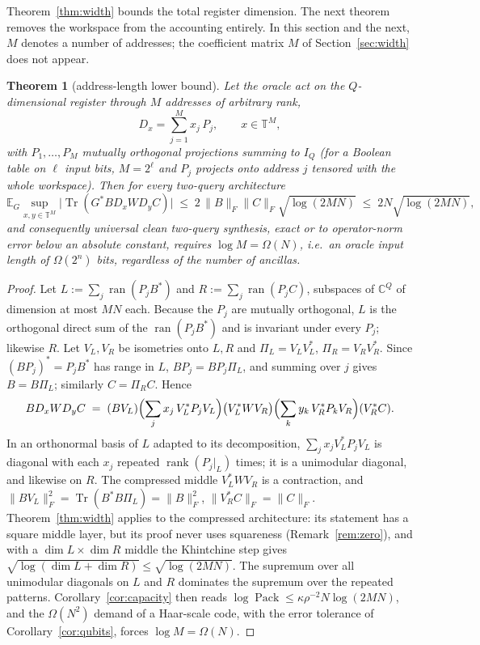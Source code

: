\documentclass[11pt,a4paper]{article}
\theoremstyle{plain}
\newtheorem{theorem}{Theorem}[section]
\theoremstyle{definition}
\theoremstyle{remark}
\DeclareMathOperator{\Tr}{Tr}
\DeclareMathOperator{\ran}{ran}
\DeclareMathOperator{\Pack}{Pack}
\DeclareMathOperator{\rank}{rank}
\newcommand{\T}{\mathbb T}
\newcommand{\C}{\mathbb C}
\newcommand{\E}{\mathbb E}
\newcommand{\Fro}[1]{\|#1\|_F}
\begin{document}
Theorem~\ref{thm:width} bounds the total register dimension. The next theorem removes the
workspace from the accounting entirely. In this section and the next, $M$ denotes a number
of addresses; the coefficient matrix $M$ of Section~\ref{sec:width} does not appear.

\begin{theorem}[address-length lower bound]\label{thm:address}
Let the oracle act on the $Q$-dimensional register through $M$ addresses of arbitrary rank,
\[
D_x=\sum_{j=1}^{M}x_j\,P_j,\qquad x\in\T^M,
\]
with $P_1,\dots,P_M$ mutually orthogonal projections summing to $I_Q$ (for a Boolean table on
$\ell$ input bits, $M=2^\ell$ and $P_j$ projects onto address $j$ tensored with the whole
workspace). Then for every two-query architecture
\[
\E_G\sup_{x,y\in\T^M}\bigl|\Tr(G^{*}BD_xWD_yC)\bigr|\;\le\;2\,\Fro{B}\Fro{C}\sqrt{\log(2MN)}
\;\le\;2N\sqrt{\log(2MN)},
\]
and consequently universal clean two-query synthesis, exact or to operator-norm error below
an absolute constant, requires $\log M=\Omega(N)$, i.e.\ an oracle input length of
$\Omega(2^n)$ bits, regardless of the number of ancillas.
\end{theorem}

\begin{proof}
Let $L:=\sum_j\ran(P_jB^{*})$ and $R:=\sum_j\ran(P_jC)$, subspaces of $\C^Q$ of dimension at
most $MN$ each. Because the $P_j$ are mutually orthogonal, $L$ is the orthogonal direct sum
of the $\ran(P_jB^{*})$ and is invariant under every $P_j$; likewise $R$. Let $V_L,V_R$ be
isometries onto $L,R$ and $\Pi_L=V_LV_L^{*}$, $\Pi_R=V_RV_R^{*}$. Since $(BP_j)^{*}=P_jB^{*}$
has range in $L$, $BP_j=BP_j\Pi_L$, and summing over $j$ gives $B=B\Pi_L$; similarly
$C=\Pi_RC$. Hence
\[
BD_xWD_yC\;=\;(BV_L)\Bigl(\sum_jx_j\,V_L^{*}P_jV_L\Bigr)\bigl(V_L^{*}WV_R\bigr)\Bigl(\sum_ky_k\,V_R^{*}P_kV_R\Bigr)(V_R^{*}C).
\]
In an orthonormal basis of $L$ adapted to its decomposition, $\sum_jx_jV_L^{*}P_jV_L$ is
diagonal with each $x_j$ repeated $\rank(P_j|_L)$ times; it is a unimodular diagonal, and
likewise on $R$. The compressed middle $V_L^{*}WV_R$ is a contraction, and
$\Fro{BV_L}^2=\Tr(B^{*}B\Pi_L)=\Fro{B}^2$, $\Fro{V_R^{*}C}=\Fro{C}$. Theorem~\ref{thm:width}
applies to the compressed architecture: its statement has a square middle layer, but its
proof never uses squareness (Remark~\ref{rem:zero}), and with a $\dim L\times\dim R$ middle
the Khintchine step gives $\sqrt{\log(\dim L+\dim R)}\le\sqrt{\log(2MN)}$. The supremum over
all unimodular diagonals on $L$ and $R$ dominates the supremum over the repeated patterns.
Corollary~\ref{cor:capacity} then reads $\log\Pack\le\kappa\rho^{-2}N\log(2MN)$, and the
$\Omega(N^2)$ demand of a Haar-scale code, with the error tolerance of
Corollary~\ref{cor:qubits}, forces $\log M=\Omega(N)$.
\end{proof}
\end{document}
